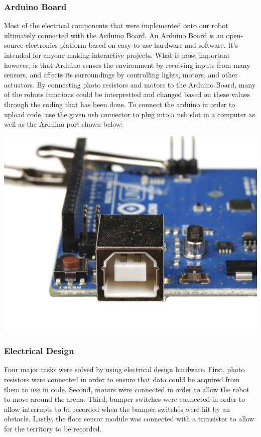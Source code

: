 \documentclass{article}
\begin{document}
    \subsubsection{Arduino Board}
    Most of the electrical components that were implemented onto our robot ultimately connected with the Arduino Board. An Arduino Board is  an open-source electronics platform based on easy-to-use hardware and software. It's intended for anyone making interactive projects. What is most important however, is that Arduino senses the environment by receiving inputs from many sensors, and affects its surroundings by controlling lights, motors, and other actuators. By connecting photo resistors and motors to the Arduino Board, many of the robots functions could be interpretted and changed based on these values through the coding that has been done. To connect the arduino in order to upload code, use the given usb connector to plug into a usb slot in a computer as well as the Arduino port shown below: 
    
    \begin{center}
    \includegraphics[]{ArdunioPort.JPG}
    \end{center}

    \subsubsection{Electrical Design}
    Four major tasks were solved by using electrical design hardware. First, photo resistors were connected in order to ensure that data could be acquired from them to use in code. Second, motors were connected in order to allow the robot to move around the arena. Third, bumper switches were connected in order to allow interrupts to be recorded when the bumper switches were hit by an obstacle. Lastly, the floor sensor module was connected with a transistor to allow for the territory to be recorded.
    
\end{document}

